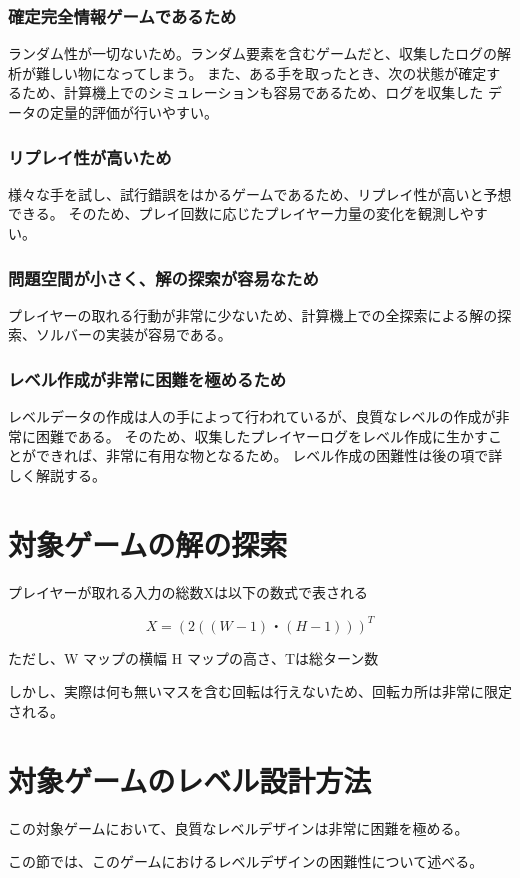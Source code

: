 \subsubsection{確定完全情報ゲームであるため}
ランダム性が一切ないため。ランダム要素を含むゲームだと、収集したログの解析が難しい物になってしまう。
また、ある手を取ったとき、次の状態が確定するため、計算機上でのシミュレーションも容易であるため、ログを収集した
データの定量的評価が行いやすい。
\subsubsection{リプレイ性が高いため}
様々な手を試し、試行錯誤をはかるゲームであるため、リプレイ性が高いと予想できる。
そのため、プレイ回数に応じたプレイヤー力量の変化を観測しやすい。

\subsubsection{問題空間が小さく、解の探索が容易なため}
プレイヤーの取れる行動が非常に少ないため、計算機上での全探索による解の探索、ソルバーの実装が容易である。

\subsubsection{レベル作成が非常に困難を極めるため}
レベルデータの作成は人の手によって行われているが、良質なレベルの作成が非常に困難である。
そのため、収集したプレイヤーログをレベル作成に生かすことができれば、非常に有用な物となるため。
レベル作成の困難性は後の項で詳しく解説する。


\section{対象ゲームの解の探索}
プレイヤーが取れる入力の総数Xは以下の数式で表される

\[ X = (2((W-1)・(H-1)))^T \]

ただし、W マップの横幅 H マップの高さ、Tは総ターン数

しかし、実際は何も無いマスを含む回転は行えないため、回転カ所は非常に限定される。


\section{対象ゲームのレベル設計方法}
この対象ゲームにおいて、良質なレベルデザインは非常に困難を極める。

この節では、このゲームにおけるレベルデザインの困難性について述べる。


